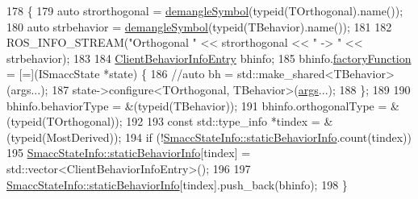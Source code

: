 \begin{DoxyCode}
178   \{
179     \textcolor{keyword}{auto} strorthogonal = \hyperlink{namespacesmacc_1_1introspection_a2f495108db3e57604d8d3ff5ef030302}{demangleSymbol}(\textcolor{keyword}{typeid}(TOrthogonal).name());
180     \textcolor{keyword}{auto} strbehavior = \hyperlink{namespacesmacc_1_1introspection_a2f495108db3e57604d8d3ff5ef030302}{demangleSymbol}(\textcolor{keyword}{typeid}(TBehavior).name());
181 
182     ROS\_INFO\_STREAM(\textcolor{stringliteral}{"Orthogonal "} << strorthogonal << \textcolor{stringliteral}{" -> "} << strbehavior);
183 
184     \hyperlink{structsmacc_1_1introspection_1_1ClientBehaviorInfoEntry}{ClientBehaviorInfoEntry} bhinfo;
185     bhinfo.\hyperlink{structsmacc_1_1introspection_1_1ClientBehaviorInfoEntry_abb0863623802e0107c659e61931518f4}{factoryFunction} = [=](ISmaccState *state) \{
186       \textcolor{comment}{//auto bh = std::make\_shared<TBehavior>(args...);}
187       state->configure<TOrthogonal, TBehavior>(\hyperlink{namespacegenerate__debs_a75f9143e38df82d83b2e8a6f99cae02c}{args}...);
188     \};
189 
190     bhinfo.behaviorType = &(\textcolor{keyword}{typeid}(TBehavior));
191     bhinfo.orthogonalType = &(\textcolor{keyword}{typeid}(TOrthogonal));
192 
193     \textcolor{keyword}{const} std::type\_info *tindex = &(\textcolor{keyword}{typeid}(MostDerived));
194     \textcolor{keywordflow}{if} (!\hyperlink{classsmacc_1_1introspection_1_1SmaccStateInfo_ad3d8b3450060cb0b91f38fb2fe0a7678}{SmaccStateInfo::staticBehaviorInfo}.count(tindex))
195       \hyperlink{classsmacc_1_1introspection_1_1SmaccStateInfo_ad3d8b3450060cb0b91f38fb2fe0a7678}{SmaccStateInfo::staticBehaviorInfo}[tindex] = 
      std::vector<ClientBehaviorInfoEntry>();
196 
197     \hyperlink{classsmacc_1_1introspection_1_1SmaccStateInfo_ad3d8b3450060cb0b91f38fb2fe0a7678}{SmaccStateInfo::staticBehaviorInfo}[tindex].push\_back(bhinfo);
198   \}
\end{DoxyCode}
\mbox{\label{classsmacc_1_1SmaccState_aac23d8a6909f75c5e5fca2a7c09b5368}} 
